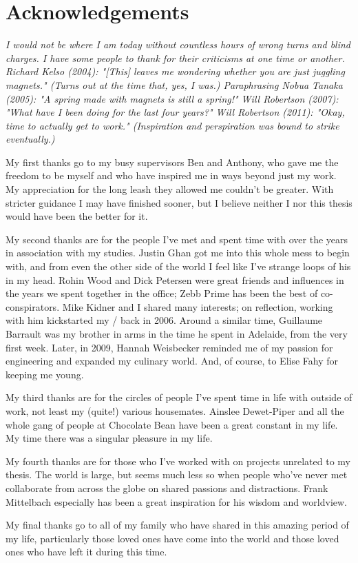 
\section{Acknowledgements}

\itshape
I would not be where I am today without countless hours of wrong turns and
blind charges.
I have some people to thank for their criticisms at one time or another.
Richard Kelso (2004): "[This] leaves me wondering whether you are just juggling magnets." (Turns out at the time that, yes, I was.)
Paraphrasing Nobua Tanaka (2005): "A spring made with magnets is still a spring!"
Will Robertson (2007): "What have I been doing for the last four years?"
Will Robertson (2011): "Okay, time to actually get to work."
(Inspiration and perspiration was bound to strike eventually.)

My first thanks go to my busy supervisors Ben and Anthony, who gave me the freedom to be myself and who have inspired me in ways beyond just my work.
My appreciation for the long leash they allowed me couldn't be greater.
With stricter guidance I may have finished sooner, but I believe neither I nor this thesis would have been the better for it.

My second thanks are for the people I've met and spent time with over the years in association with my studies.
Justin Ghan got me into this whole mess to begin with, and from even the other side of the world I feel like I've strange loops of his in my head.
Rohin Wood and Dick Petersen were great friends and influences in the years we spent together in the office; Zebb Prime has been the best of co-conspirators.
Mike Kidner and I shared many interests; on reflection, working with him kickstarted my \PhD/ back in 2006.
Around a similar time, Guillaume Barrault was my brother in arms in the time he spent in Adelaide, from the very first week.
Later, in 2009, Hannah Weisbecker reminded me of my passion for engineering and expanded my culinary world.
And, of course, to Elise Fahy for keeping me young.

My third thanks are for the circles of people I've spent time in life with outside of work, not least my (quite!) various housemates.
Ainslee Dewet-Piper and all the whole gang of people at Chocolate Bean have been a great constant in my life.
My time there was a singular pleasure in my life.

My fourth thanks are for those who I've worked with on projects unrelated to my thesis.
The world is large, but seems much less so when people who've never met collaborate from across the globe on shared passions and distractions.
Frank Mittelbach especially has been a great inspiration for his wisdom and worldview.

My final thanks go to all of my family who have shared in this amazing period of my life, particularly those loved ones have come into the world and those loved ones who have left it during this time.
\upshape
